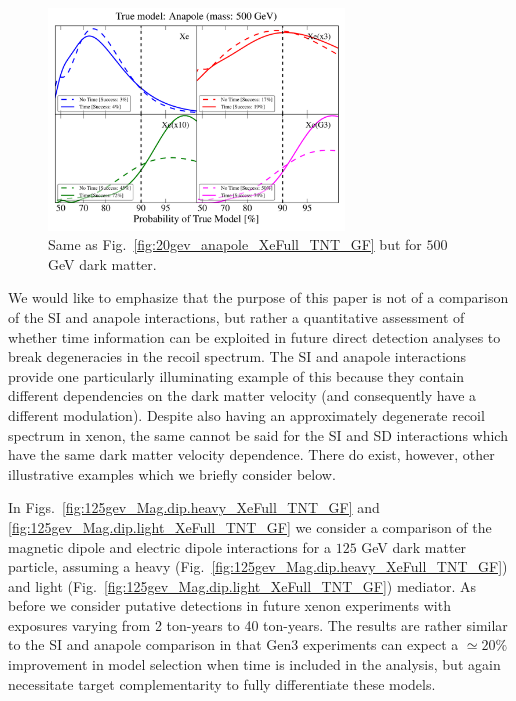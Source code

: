 \documentclass[11pt]{article}
\newcommand{\Fig}[1]{Fig.~\ref{#1}} \newcommand{\Figs}[2]{Figs.~\ref{#1} and \ref{#2}}
\begin{document}
\begin{figure}
\centering
\includegraphics[width=0.7\textwidth]{plots/PDF_500GeV_Anapole_50sims_Xe_Xe3x_Xe10x_XeG3_GF_TNT.pdf}
\caption{\label{fig:500gev_anapole_XeFull_TNT_GF}
Same as Fig.~\ref{fig:20gev_anapole_XeFull_TNT_GF} but for $500$ GeV dark matter.}
\end{figure}

We would like to emphasize that the purpose of this paper is not of a comparison of the SI and anapole interactions, but rather a quantitative assessment of whether time information can be exploited in future direct detection analyses to break degeneracies in the recoil spectrum. The SI and anapole interactions provide one particularly illuminating example of this because they contain different dependencies on the dark matter velocity (and consequently have a different modulation). Despite also having an approximately degenerate recoil spectrum in xenon, the same cannot be said for the SI and SD interactions which have the same dark matter velocity dependence. There do exist, however, other illustrative examples which we briefly consider below.

In \Figs{fig:125gev_Mag.dip.heavy_XeFull_TNT_GF}{fig:125gev_Mag.dip.light_XeFull_TNT_GF} we consider a comparison of the magnetic dipole and electric dipole interactions for a $125$ GeV dark matter particle, assuming a heavy (\Fig{fig:125gev_Mag.dip.heavy_XeFull_TNT_GF}) and light (\Fig{fig:125gev_Mag.dip.light_XeFull_TNT_GF}) mediator. As before we consider putative detections in future xenon experiments with exposures varying from 2 ton-years to 40 ton-years. The results are rather similar to the SI and anapole comparison in that Gen3 experiments can expect a $\simeq 20\%$ improvement in model selection when time is included in the analysis, but again necessitate target complementarity to fully differentiate these models.
\end{document}
